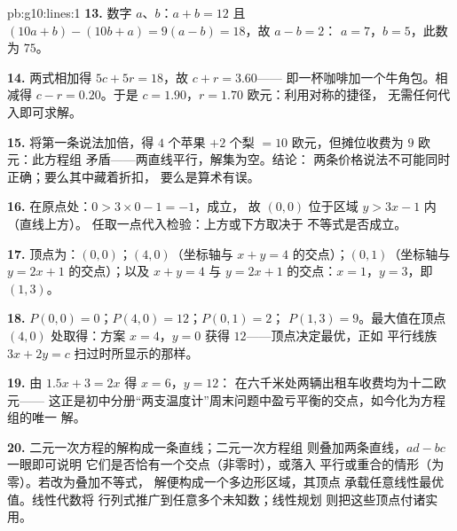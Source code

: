 \begin{solution}{pb:g10:lines:1}
\textbf{13.} 数字 $a$、$b$：$a + b = 12$ 且
$(10a + b) - (10b + a) = 9(a - b) = 18$，故 $a - b = 2$：
$a = 7$，$b = 5$，此数为 $75$。

\textbf{14.} 两式相加得 $5c + 5r = 18$，故 $c + r = 3.60$——
即一杯咖啡加一个牛角包。相减得 $c - r = 0.20$。于是
$c = 1.90$，$r = 1.70$ 欧元：利用对称的捷径，
无需任何代入即可求解。

\textbf{15.} 将第一条说法加倍，得 $4$ 个苹果 $+ 2$
个梨 $= 10$ 欧元，但摊位收费为 $9$ 欧元：此方程组
矛盾——两直线平行，解集为空。结论：
两条价格说法不可能同时正确；要么其中藏着折扣，
要么是算术有误。

\textbf{16.} 在原点处：$0 > 3 \times 0 - 1 = -1$，成立，
故 $(0,0)$ 位于区域 $y > 3x - 1$ 内（直线上方）。
任取一点代入检验：上方或下方取决于
不等式是否成立。

\textbf{17.} 顶点为：$(0, 0)$；$(4, 0)$（坐标轴与
$x + y = 4$ 的交点）；$(0, 1)$（坐标轴与 $y = 2x + 1$ 的交点）；以及
$x + y = 4$ 与 $y = 2x + 1$ 的交点：$x = 1$，$y = 3$，即 $(1, 3)$。

\textbf{18.} $P(0,0) = 0$；$P(4, 0) = 12$；$P(0, 1) = 2$；
$P(1, 3) = 9$。最大值在顶点 $(4, 0)$ 处取得：方案
$x = 4$，$y = 0$ 获得 $12$——顶点决定最优，正如
平行线族 $3x + 2y = c$ 扫过时所显示的那样。

\textbf{19.} 由 $1.5x + 3 = 2x$ 得 $x = 6$，$y = 12$：
在六千米处两辆出租车收费均为十二欧元——
这正是初中分册“两支温度计”周末问题中盈亏平衡的交点，如今化为方程组的唯一
解。

\textbf{20.} 二元一次方程的解构成一条直线；二元一次方程组
则叠加两条直线，$ad - bc$ 一眼即可说明
它们是否恰有一个交点（非零时），或落入
平行或重合的情形（为零）。若改为叠加不等式，
解便构成一个多边形区域，其顶点
承载任意线性最优值。线性代数将
行列式推广到任意多个未知数；线性规划
则把这些顶点付诸实用。
\end{solution}
